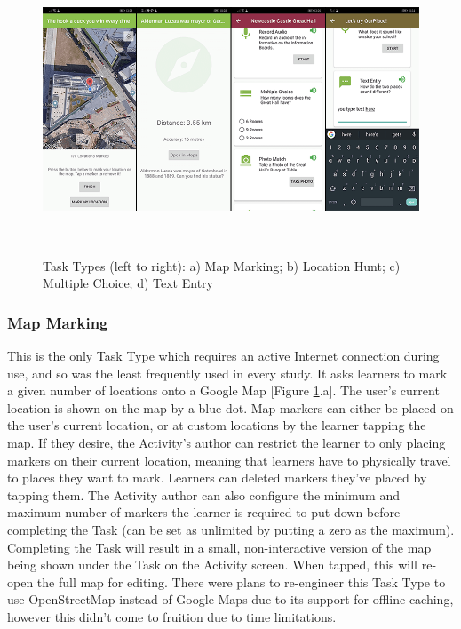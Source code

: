 \begin{figure}
  \centering
  \includegraphics[width=1\columnwidth]{images/chapter05/tasktypes3.png}
  \caption[Task Types (part 3)]{Task Types (left to right): a) Map Marking; b) Location Hunt; c) Multiple Choice; d) Text Entry}~\label{fig:TaskTypes3}
\end{figure}

\subsubsection*{Map Marking}
This is the only Task Type which requires an active Internet connection during use, and so was the least frequently used in every study. It asks learners to mark a given number of locations onto a Google Map [Figure \ref{fig:TaskTypes3}.a]. The user's current location is shown on the map by a blue dot. Map markers can either be placed on the user's current location, or at custom locations by the learner tapping the map. If they desire, the Activity's author can restrict the learner to only placing markers on their current location, meaning that learners have to physically travel to places they want to mark. Learners can deleted markers they've placed by tapping them. The Activity author can also configure the minimum and maximum number of markers the learner is required to put down before completing the Task (can be set as unlimited by putting a zero as the maximum). Completing the Task will result in a small, non-interactive version of the map being shown under the Task on the Activity screen. When tapped, this will re-open the full map for editing. There were plans to re-engineer this Task Type to use OpenStreetMap instead of Google Maps due to its support for offline caching, however this didn't come to fruition due to time limitations.

